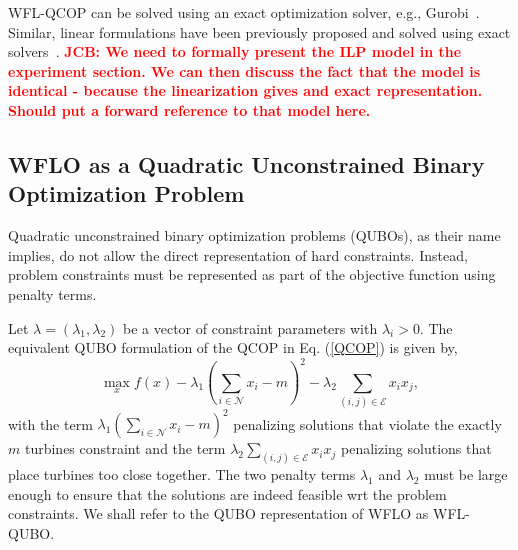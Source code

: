 \documentclass[preprint,12pt]{elsarticle}
\newcommand{\todo}[1]{{\textcolor{red}{\bf {#1}}}}
\begin{document}
WFL-QCOP can be solved using an exact optimization solver, e.g., Gurobi~\cite{gurobi}. 
Similar, linear formulations have been previously proposed and solved using exact solvers~\cite{Zhang2014,donovan2005wind}.
\todo{JCB: We need to formally present the ILP model in the experiment section. We can then discuss the fact that the model is identical - because the linearization gives and exact representation. Should put a forward reference to that model here.}



\subsection{WFLO as a Quadratic Unconstrained Binary Optimization Problem}

Quadratic unconstrained binary optimization problems (QUBOs), as their name implies, do not allow the direct representation of hard constraints. Instead, 
problem constraints must be represented as part of the objective function
using penalty terms. 

Let $\lambda = (\lambda_1,\lambda_2)$ 
be a vector of constraint parameters with $\lambda_i >0$. The equivalent QUBO formulation of the QCOP in Eq. (\ref{QCOP}) is given by,
\begin{equation}\max_{x}^{} f(x) - \lambda_1 (\sum_{i \in \mathcal{N}}^{} x_i -m) ^2 - \lambda_2 \sum_{(i,j) \in \mathcal{E}}^{} x_i x_j , \label{QUBO}\end{equation}
with the term $ \lambda_1 (\sum_{i \in \mathcal{N}}^{} x_i -m) ^2$ 
penalizing solutions that violate the exactly $m$ turbines constraint and the term $\lambda_2 \sum_{(i,j) \in \mathcal{E}}^{} x_i x_j$ penalizing
solutions that place turbines too close together. The two penalty terms $\lambda_1$ and $\lambda_2$ 
must be large enough to ensure that the solutions are indeed feasible wrt the problem constraints. We shall refer to the QUBO representation of WFLO as WFL-QUBO.
\end{document}
